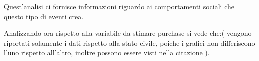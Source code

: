 \documentclass{article}
\begin{document}
\begin{figure}[htp!]
\centering
{}
\end{figure}

Quest'analisi ci fornisce informazioni riguardo ai comportamenti sociali che questo tipo di eventi crea.

Analizzando ora rispetto alla variabile da stimare purchase si vede che:( vengono riportati solamente i dati rispetto alla stato civile, poiche i grafici non differiscono l'uno rispetto all'altro, inoltre possono essere visti nella citazione \cite{code} ).
\end{document}
